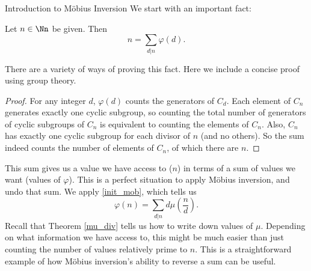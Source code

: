 \documentclass[12pt]{pom_thesis}
\begin{document}
\begin{chapter}{Introduction to M\"obius Inversion}
We start with an important fact:
\begin{thm}[Gauss]\label{gauss}
Let $n \in \Nn$ be given. Then 
\[
n = \sum_{d|n}\varphi(d).
\]
\end{thm}
There are a variety of ways of proving this fact. Here we include a concise proof using group theory.
\begin{proof}
For any integer $d$, $\varphi(d)$ counts the generators of $C_d$. Each element of $C_n$ generates exactly one cyclic subgroup, so counting the total number of generators of cyclic subgroups of $C_n$ is equivalent to counting the elements of $C_n$. Also, $C_n$ has exactly one cyclic subgroup for each divisor of $n$ (and no others). So the sum indeed counts the number of elements of $C_n$, of which there are $n$.
\end{proof}
This sum gives us a value we have access to ($n$) in terms of a sum of values we want (values of $\varphi$). This is a perfect situation to apply M\"obius inversion, and undo that sum. We apply \eqref{init_mob}, which tells us
\[
\varphi(n) = \sum_{d|n} d\mu\left(\frac nd\right).
\]
Recall that Theorem \ref{mu_div} tells us how to write down values of $\mu$. Depending on what information we have access to, this might be much easier than just counting the number of values relatively prime to $n$. This is a straightforward example of how M\"obius inversion's ability to reverse a sum can be useful.
\end{chapter}
\end{document}
